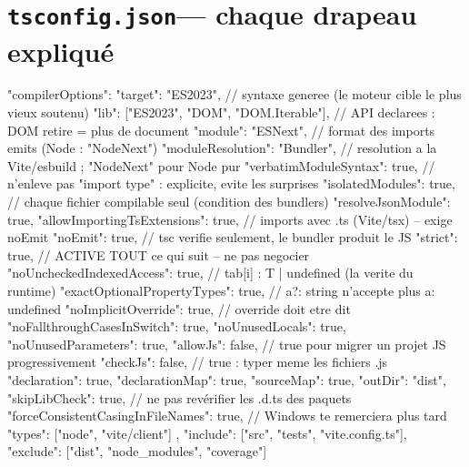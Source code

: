 \documentclass[12pt,a4paper,twoside,openright]{book}
\begin{document}
\section{\texttt{tsconfig.json}--- chaque drapeau expliqu\'e}

\begin{codejson}
{
  "compilerOptions": {
    "target": "ES2023",                       // syntaxe generee (le moteur cible le plus vieux soutenu)
    "lib": ["ES2023", "DOM", "DOM.Iterable"], // API declarees : DOM retire = plus de document
    "module": "ESNext",                        // format des imports emits (Node : "NodeNext")
    "moduleResolution": "Bundler",               // resolution a la Vite/esbuild ; "NodeNext" pour Node pur
    "verbatimModuleSyntax": true,                // n'enleve pas "import type" : explicite, evite les surprises
    "isolatedModules": true,                     // chaque fichier compilable seul (condition des bundlers)
    "resolveJsonModule": true,
    "allowImportingTsExtensions": true,           // imports avec .ts (Vite/tsx) -- exige noEmit
    "noEmit": true,                                // tsc verifie seulement, le bundler produit le JS
    "strict": true,                                // ACTIVE TOUT ce qui suit -- ne pas negocier
    "noUncheckedIndexedAccess": true,              // tab[i] : T | undefined  (la verite du runtime)
    "exactOptionalPropertyTypes": true,            // { a?: string } n'accepte plus a: undefined
    "noImplicitOverride": true,                     // override doit etre dit
    "noFallthroughCasesInSwitch": true,
    "noUnusedLocals": true, "noUnusedParameters": true,
    "allowJs": false,                               // true pour migrer un projet JS progressivement
    "checkJs": false,                               // true : typer meme les fichiers .js
    "declaration": true, "declarationMap": true, "sourceMap": true,
    "outDir": "dist",
    "skipLibCheck": true,                             // ne pas rev\'erifier les .d.ts des paquets
    "forceConsistentCasingInFileNames": true,          // Windows te remerciera plus tard
    "types": ["node", "vite/client"]
  },
  "include": ["src", "tests", "vite.config.ts"],
  "exclude": ["dist", "node_modules", "coverage"]
}
\end{codejson}

\end{document}
